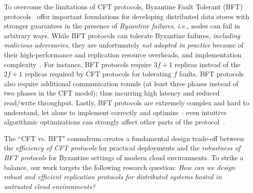  





To overcome the limitations of  CFT protocols, Byzantine Fault Tolerant (BFT) protocols~\cite{Lamport:1982} offer important foundations for developing distributed data stores with stronger guarantees in the presence of {\em Byzantine failures}, {\em i.e.}, nodes can fail in arbitrary ways. While BFT protocols can tolerate Byzantine failures, {\em including malicious adversaries}, they are unfortunately {\em not adopted in practice} because of their high-performance and replication resource overheads, and implementation complexity~\cite{visigoth-eurosys}. For instance, BFT protocols require $3f+1$ replicas instead of the $2f+1$ replicas required by CFT protocols for tolerating $f$ faults. BFT protocols also require additional communication rounds (at least three phases instead of two phases in the CFT model); thus incurring high latency and reduced read/write throughput. Lastly, BFT protocols are extremely complex and hard to understand, let alone to implement correctly and optimize~\cite{unsafeZyzzyva}: even intuitive algorithmic optimizations can strongly affect other parts of the protocol~\cite{10.1145/2658994}.

The  “CFT vs. BFT" conundrum creates a fundamental design trade-off between the {\em efficiency of CFT protocols} for practical deployments and the {\em robustness of BFT protocols} for Byzantine settings of modern cloud environments. To strike a balance, our work targets the following research question: {\em How can we design robust and efficient replication protocols for distributed systems hosted in untrusted cloud environments?}

